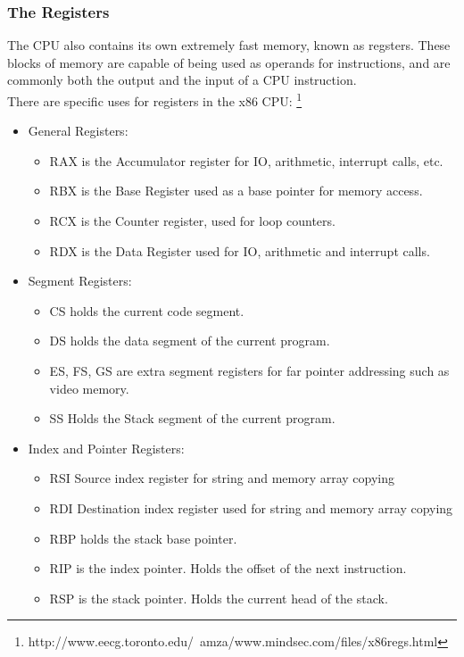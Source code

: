 \documentclass[a4paper,11pt]{report}
\begin{document}
			\subsubsection{The Registers}
				The CPU also contains its own extremely fast memory, known as regsters. 
				These blocks of memory are capable of being used as operands for instructions, and are commonly both the output and the input of a CPU instruction.\\ 
				There are specific uses for registers in the x86 CPU: \footnote{http://www.eecg.toronto.edu/~amza/www.mindsec.com/files/x86regs.html}
				\begin{itemize}
					\item General Registers: 
						\begin{itemize}
							\item RAX is the Accumulator register for IO, arithmetic, interrupt calls, etc. 
							\item RBX is the Base Register used as a base pointer for memory access. 
							\item RCX is the Counter register, used for loop counters. 
							\item RDX is the Data Register used for IO, arithmetic and interrupt calls. 
						\end{itemize}
					\item Segment Registers: 
						\begin{itemize}
							\item CS holds the current code segment. 
							\item DS holds the data segment of the current program. 
							\item ES, FS, GS are extra segment registers for far pointer addressing such as video memory. 
							\item SS Holds the Stack segment of the current program. 
						\end{itemize}
					\item Index and Pointer Registers: 
						\begin{itemize}
							\item RSI Source index register for string and memory array copying
							\item RDI Destination index register used for string and memory array copying
							\item RBP holds the stack base pointer. 
							\item RIP is the index pointer. Holds the offset of the next instruction. 
							\item RSP is the stack pointer. Holds the current head of the stack. 

\end{itemize}
\end{itemize}
\end{document}
